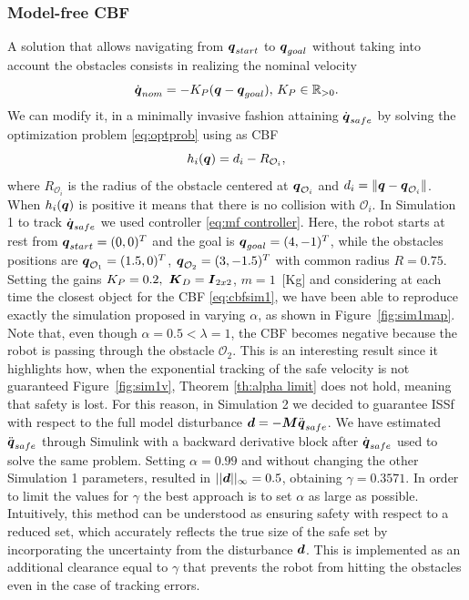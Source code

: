 \subsubsection{Model-free CBF}
A solution that allows navigating from ${\boldsymbol{q}}_{start}$ to ${\boldsymbol{q}}_{goal}$ without taking into account the obstacles consists in realizing the nominal velocity   
\begin{equation}
    \dot{{\boldsymbol{q}}}_{nom}=-K_P({\boldsymbol{q}} - {\boldsymbol{q}}_{goal}),\,K_P\in\mathbb{R}_{>0}.
\end{equation}
We can modify it, in a minimally invasive fashion attaining $\dot{\boldsymbol{q}}_{safe}$ by solving the optimization problem \eqref{eq:optprob} using as CBF
\begin{equation}\label{eq:cbfsim1}
h_i({\boldsymbol{q}})=d_{i}-R_{\mathcal{O}_i},
\end{equation}
 where $R_{\mathcal{O}_i}$ is the radius of the obstacle centered at ${\boldsymbol{q}}_{\mathcal{O}_i}$ and $d_{i} = \lVert {\boldsymbol{q}}-{\boldsymbol{q}}_{\mathcal{O}_i} \rVert$.
When $h_i({\boldsymbol{q}})$ is positive it means that there is no collision with $\mathcal{O}_i$.
In Simulation 1 to track $\dot{\boldsymbol{q}}_{safe}$ we used controller \eqref{eq:mf controller}.
Here, the robot starts at rest from ${\boldsymbol{q}}_{start}=(0,0)^T$ and the goal is ${\boldsymbol{q}}_{goal}=(4,-1)^T$, while the obstacles positions are ${\boldsymbol{q}}_{\mathcal{O}_1}=(1.5,0)^T$, ${\boldsymbol{q}}_{\mathcal{O}_2}=(3,-1.5)^T$ with common radius $R=0.75$. Setting the gains $K_P = 0.2,~\boldsymbol{K}_D=\boldsymbol{I}_{2x2}$, $m=1$~[Kg] and considering at each time the closest object for the CBF \eqref{eq:cbfsim1}, we have been able to reproduce exactly the simulation proposed in \cite{mfcbf} varying $\alpha$, as shown in Figure~\ref{fig:sim1map}.
Note that, even though $\alpha=0.5 < \lambda = 1$, the CBF becomes negative because the robot is passing through the obstacle $\mathcal{O}_2$. This is an interesting result since it highlights how, when the exponential tracking of the safe velocity is not guaranteed Figure~\ref{fig:sim1v}, Theorem \ref{th:alpha limit} does not hold, meaning that safety is lost. 
For this reason, in Simulation 2 we decided to guarantee ISSf with respect to the full model disturbance $\boldsymbol{d} = -\boldsymbol{M}\ddot{{\boldsymbol{q}}}_{safe}$. We have estimated $\ddot{\boldsymbol{q}}_{safe}$ through Simulink with a backward derivative block after $\dot{\boldsymbol{q}}_{safe}$ used to solve the same problem. Setting $\alpha=0.99$ and without changing the other Simulation 1 parameters, resulted in $||\boldsymbol{d}||_\infty = 0.5$, obtaining $\gamma = 0.3571$. In order to limit the values for $\gamma$ the best approach is to set $\alpha$ as large as possible. Intuitively, this method can be understood as ensuring safety with respect to a reduced set, which accurately reflects the true size of the safe set by incorporating the uncertainty from the disturbance $\boldsymbol{d}$. This is implemented as an additional clearance equal to $\gamma$ that prevents the robot from hitting the obstacles even in the case of tracking errors. 

